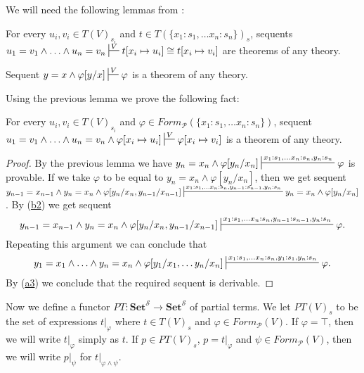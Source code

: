 \documentclass[reqno]{amsart}
\newcommand{\axref}[1]{(\hyperref[ax:#1]{#1})}
\theoremstyle{definition}
\theoremstyle{remark}
\newcommand{\cat}[1]{\mathbf{#1}}
\newcommand{\Set}{\cat{Set}}
\numberwithin{figure}{section}
\begin{document}
We will need the following lemmas from \cite{PHL}:
\begin{lem}[cong-a]
For every $u_i,v_i \in T(V)_{s_i}$ and $t \in T(\{ x_1 : s_1, \ldots x_n : s_n\})_s$,
sequents $u_1 = v_1 \land \ldots \land u_n = v_n \sststile{}{V} t[x_i \mapsto u_i] \cong t[x_i \mapsto v_i]$ are theorems of any theory.
\end{lem}

\begin{lem}
Sequent $y = x \land \varphi[y/x] \sststile{}{V} \varphi$ is a theorem of any theory.
\end{lem}

Using the previous lemma we prove the following fact:

\begin{lem}[cong-b]
For every $u_i,v_i \in T(V)_{s_i}$ and $\varphi \in Form_\mathcal{P}(\{ x_1 : s_1, \ldots x_n : s_n\})$,
sequent $u_1 = v_1 \land \ldots \land u_n = v_n \land \varphi[x_i \mapsto u_i] \sststile{}{V} \varphi[x_i \mapsto v_i]$ is a theorem of any theory.
\end{lem}
\begin{proof}
By the previous lemma we have $y_n = x_n \land \varphi[y_n/x_n] \sststile{}{x_1 : s_1, \ldots x_n : s_n, y_n : s_n} \varphi$ is provable.
If we take $\varphi$ to be equal to $y_n = x_n \land \varphi[y_n/x_n]$, then we get sequent
$y_{n-1} = x_{n-1} \land y_n = x_n \land \varphi[y_n/x_n,y_{n-1}/x_{n-1}] \sststile{}{x_1 : s_1, \ldots x_n : s_n, y_{n-1} : s_{n-1}, y_n : s_n} y_n = x_n \land \varphi[y_n/x_n]$.
By \axref{b2} we get sequent
\[ y_{n-1} = x_{n-1} \land y_n = x_n \land \varphi[y_n/x_n,y_{n-1}/x_{n-1}] \sststile{}{x_1 : s_1, \ldots x_n : s_n, y_{n-1} : s_{n-1}, y_n : s_n} \varphi. \]
Repeating this argument we can conclude that
\[ y_1 = x_1 \land \ldots \land y_n = x_n \land \varphi[y_1/x_1, \ldots y_n/x_n] \sststile{}{x_1 : s_1, \ldots x_n : s_n, y_1 : s_1, y_n : s_n} \varphi. \]
By \axref{a3} we conclude that the required sequent is derivable.
\end{proof}

Now we define a functor $PT : \Set^\mathcal{S} \to \Set^\mathcal{S}$ of partial terms.
We let $PT(V)_s$ to be the set of expressions $t|_\varphi$ where $t \in T(V)_s$ and $\varphi \in Form_\mathcal{P}(V)$.
If $\varphi = \top$, then we will write $t|_\varphi$ simply as $t$.
If $p \in PT(V)_s$, $p = t|_\varphi$ and $\psi \in Form_\mathcal{P}(V)$, then we will write $p|_\psi$ for $t|_{\varphi \land \psi}$.
\end{document}

